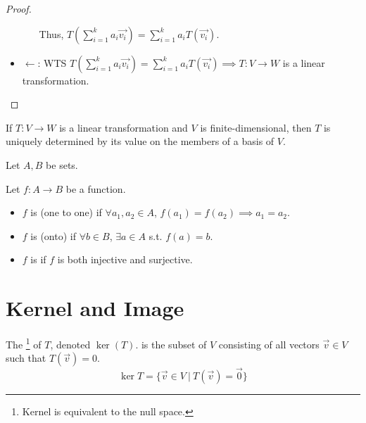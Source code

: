 \documentclass[11pt,fleqn]{book} %
\begin{document}
\begin{proof}
\begin{itemize}
\begin{itemize}
        Thus, $\displaystyle T(\sum_{i=1}^ka_i\overrightarrow{v_i})=\sum_{i=1}^ka_iT(\overrightarrow{v_i})$. 
        \end{itemize}
        
        \item $\leftarrow$: WTS $\displaystyle T(\sum_{i=1}^ka_i\overrightarrow{v_i})=\sum_{i=1}^ka_iT(\overrightarrow{v_i}) \implies T: V \to W$ is a linear transformation. 
    \end{itemize}
\end{proof}

\setcounter{dummy}{13}
\begin{proposition}
    If $T: V \to W$ is a linear transformation and $V$ is finite-dimensional, then $T$ is uniquely determined by its value on the members of a basis of $V$. 
\end{proposition}

\setcounter{section}{0}
\begin{definition}
    Let $A, B$ be sets. 

    Let $f: A \to B$ be a function. 

    \begin{itemize}
        \item $f$ is  (one to one) if $\forall a_1, a_2 \in A$, $f(a_1) = f(a_2) \implies a_1 = a_2$. 

        \item $f$ is  (onto) if $\forall b \in B$, $\exists a \in A$ s.t. $f(a) = b$. 

        \item $f$ is  if $f$ is both injective and surjective. 
    \end{itemize}
\end{definition}
\setcounter{section}{1}

\section{Kernel and Image}

\setcounter{section}{3}
\begin{definition}[Kernel]
    The \footnote{Kernel is equivalent to the null space. } of $T$, denoted $\ker(T)$. is the subset of $V$ consisting of all vectors $\overrightarrow{v} \in V$ such that $T(\overrightarrow{v}) = 0$. $$\ker T=\{ \overrightarrow{v} \in V ~|~ T(\overrightarrow{v}) = \overrightarrow{0} \}$$
\end{definition}
\end{document}
